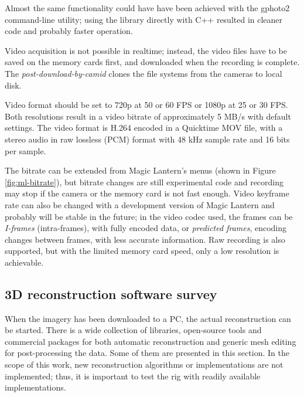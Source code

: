 Almost the same functionality could have have been achieved with the gphoto2 command-line utility; using the library directly with C++ resulted in cleaner code and probably faster operation.

Video acquisition is not possible in realtime; instead, the video files have to be saved on the memory cards first, and downloaded when the recording is complete.
The \emph{post-download-by-camid} clones the file systems from the cameras to local disk.

Video format should be set to 720p at 50 or 60 FPS or 1080p at 25 or 30 FPS.
Both resolutions result in a video bitrate of approximately 5 MB/s with default settings.
The video format is H.264 encoded in a Quicktime MOV file, with a stereo audio in raw lossless (PCM) format with 48 kHz sample rate and 16 bits per sample.

The bitrate can be extended from Magic Lantern's menus (shown in Figure \ref{fig:ml-bitrate}), but bitrate changes are still experimental code and recording may stop if the camera or the memory card is not fast enough.
Video keyframe rate can also be changed with a development version of Magic Lantern and probably will be stable in the future;
in the video codec used, the frames can be \emph{I-frames} (intra-frames), with fully encoded data, or \emph{predicted frames}, encoding changes between frames, with less accurate information.
Raw recording is also supported, but with the limited memory card speed, only a low resolution is achievable.



\subsection{3D reconstruction software survey} %

When the imagery has been downloaded to a PC, the actual reconstruction can be started.
There is a wide collection of libraries, open-source tools and commercial packages for both automatic reconstruction and generic mesh editing for post-processing the data.
Some of them are presented in this section.
In the scope of this work, new reconstruction algorithms or implementations are not implemented;
thus, it is important to test the rig with readily available implementations.

